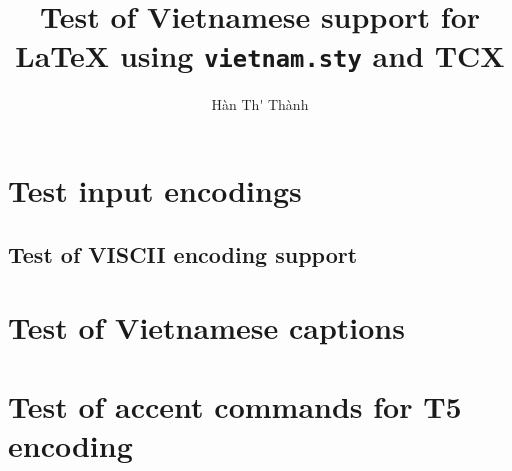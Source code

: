 \documentclass[openany]{book}
\begin{document}
\title{\bfseries Test of Vietnamese support for \LaTeX{} using
    \texttt{vietnam.sty} and TCX}
\author{H\`an Th\'\ecircumflex{} Th\`anh}
\maketitle

\tableofcontents
\listoffigures

\chapter{Test input encodings}
\section{Test of VISCII encoding support}


\clearpage
\appendix

\chapter{Test of Vietnamese captions}


\chapter{Test of accent commands for T5 encoding}

\end{document}
